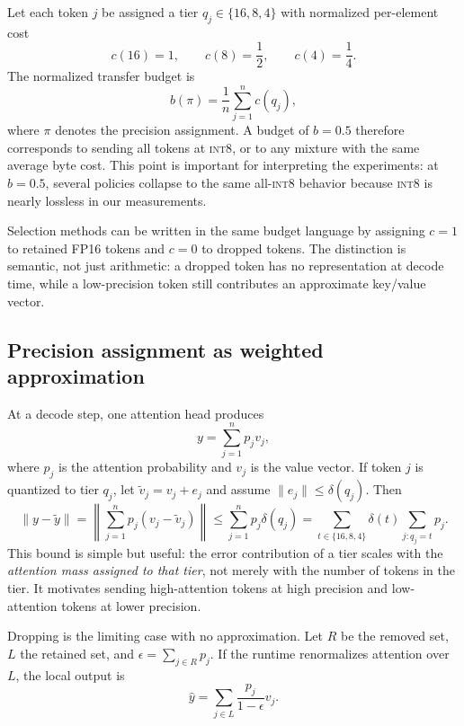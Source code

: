 \documentclass[11pt]{article}
\newcommand{\budget}{b}
\newcommand{\intviii}{\textsc{int8}}
\theoremstyle{plain}
\theoremstyle{definition}
\begin{document}
Let each token $j$ be assigned a tier $q_j\in\{16,8,4\}$ with normalized per-element cost
\begin{equation}
 c(16)=1,\qquad c(8)=\frac{1}{2},\qquad c(4)=\frac{1}{4}.
\end{equation}
The normalized transfer budget is
\begin{equation}
  \budget(\pi)=\frac{1}{n}\sum_{j=1}^n c(q_j),
  \label{eq:budget}
\end{equation}
where $\pi$ denotes the precision assignment.  A budget of $\budget=0.5$ therefore corresponds to sending all tokens at \intviii{}, or to any mixture with the same average byte cost.  This point is important for interpreting the experiments: at $\budget=0.5$, several policies collapse to the same all-\intviii{} behavior because \intviii{} is nearly lossless in our measurements.

Selection methods can be written in the same budget language by assigning $c=1$ to retained FP16 tokens and $c=0$ to dropped tokens.  The distinction is semantic, not just arithmetic: a dropped token has no representation at decode time, while a low-precision token still contributes an approximate key/value vector.

\subsection{Precision assignment as weighted approximation}
At a decode step, one attention head produces
\begin{equation}
  y = \sum_{j=1}^{n} p_j v_j,
  \label{eq:attention-output}
\end{equation}
where $p_j$ is the attention probability and $v_j$ is the value vector.  If token $j$ is quantized to tier $q_j$, let $\tilde v_j=v_j+e_j$ and assume $\|e_j\|\le \delta(q_j)$.  Then
\begin{equation}
  \|y-\tilde y\|
  =\left\|\sum_{j=1}^{n}p_j(v_j-\tilde v_j)\right\|
  \le \sum_{j=1}^{n}p_j\delta(q_j)
  =\sum_{t\in\{16,8,4\}} \delta(t)\sum_{j:q_j=t}p_j .
  \label{eq:quant-bound}
\end{equation}
This bound is simple but useful: the error contribution of a tier scales with the \emph{attention mass assigned to that tier}, not merely with the number of tokens in the tier.  It motivates sending high-attention tokens at high precision and low-attention tokens at lower precision.

Dropping is the limiting case with no approximation.  Let $R$ be the removed set, $L$ the retained set, and $\epsilon=\sum_{j\in R}p_j$.  If the runtime renormalizes attention over $L$, the local output is
\begin{equation}
  \hat y=\sum_{j\in L}\frac{p_j}{1-\epsilon}v_j .
\end{equation}
\end{document}
